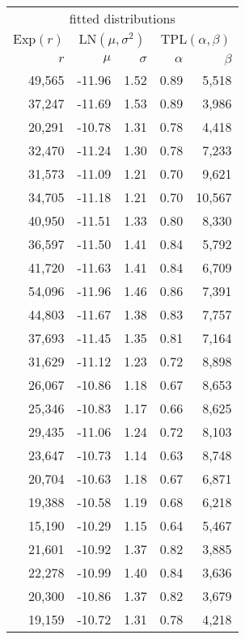 \begin{tabular}{@{}rrrrr@{}}
\toprule
\multicolumn{5}{c}{fitted distributions}\\
\cmidrule(lr){1-5}
$\text{Exp}(r)$ & \multicolumn{2}{c}{$\text{LN}(\mu, \sigma^2)$} & \multicolumn{2}{c}{$\text{TPL}(\alpha, \beta)$}\\
\cmidrule(lr){1-5}
$r$ & $\mu$ & $\sigma$ & $\alpha$ & $\beta$\\
\cmidrule(lr){1-1} \cmidrule(lr){2-3} \cmidrule(lr){4-5}
49,565 & -11.96 & 1.52 & 0.89 & 5,518 \\
37,247 & -11.69 & 1.53 & 0.89 & 3,986 \\
20,291 & -10.78 & 1.31 & 0.78 & 4,418 \\
32,470 & -11.24 & 1.30 & 0.78 & 7,233 \\
31,573 & -11.09 & 1.21 & 0.70 & 9,621 \\
34,705 & -11.18 & 1.21 & 0.70 & 10,567 \\
40,950 & -11.51 & 1.33 & 0.80 & 8,330 \\
36,597 & -11.50 & 1.41 & 0.84 & 5,792 \\
41,720 & -11.63 & 1.41 & 0.84 & 6,709 \\
54,096 & -11.96 & 1.46 & 0.86 & 7,391 \\
44,803 & -11.67 & 1.38 & 0.83 & 7,757 \\
37,693 & -11.45 & 1.35 & 0.81 & 7,164 \\
31,629 & -11.12 & 1.23 & 0.72 & 8,898 \\
26,067 & -10.86 & 1.18 & 0.67 & 8,653 \\
25,346 & -10.83 & 1.17 & 0.66 & 8,625 \\
29,435 & -11.06 & 1.24 & 0.72 & 8,103 \\
23,647 & -10.73 & 1.14 & 0.63 & 8,748 \\
20,704 & -10.63 & 1.18 & 0.67 & 6,871 \\
19,388 & -10.58 & 1.19 & 0.68 & 6,218 \\
15,190 & -10.29 & 1.15 & 0.64 & 5,467 \\
21,601 & -10.92 & 1.37 & 0.82 & 3,885 \\
22,278 & -10.99 & 1.40 & 0.84 & 3,636 \\
20,300 & -10.86 & 1.37 & 0.82 & 3,679 \\
19,159 & -10.72 & 1.31 & 0.78 & 4,218 \\
\bottomrule
\end{tabular}
